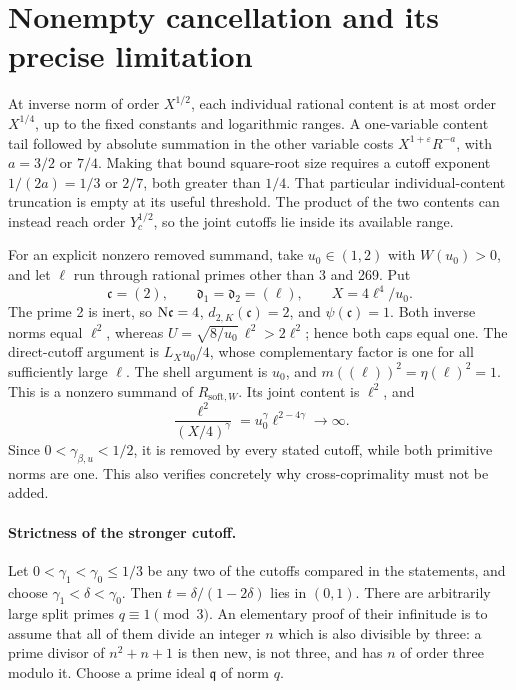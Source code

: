 \section{Nonempty cancellation and its precise limitation}
At inverse norm of order \(X^{1/2}\), each individual rational
content is at most order \(X^{1/4}\), up to the fixed constants
and logarithmic ranges.  A one-variable content tail followed
by absolute summation in the other variable costs
\(X^{1+\varepsilon}R^{-a}\), with \(a=3/2\) or \(7/4\).
Making that bound square-root size requires a cutoff exponent
\(1/(2a)=1/3\) or \(2/7\), both greater than \(1/4\).
That particular individual-content truncation is empty at its
useful threshold.  The product of the two contents can instead
reach order \(Y_c^{1/2}\), so the joint cutoffs lie inside
its available range.

For an explicit nonzero removed summand, take \(u_0\in(1,2)\)
with \(W(u_0)>0\), and let \(\ell\) run through rational primes
other than 3 and 269.  Put
\[
 \mathfrak c=(2),\qquad \mathfrak d_1=\mathfrak d_2=(\ell),
 \qquad X=4\ell^4/u_0.
\]
The prime 2 is inert, so \(\mathrm N\mathfrak c=4\),
\(d_{2,K}(\mathfrak c)=2\), and \(\psi(\mathfrak c)=1\).
Both inverse norms equal \(\ell^2\), whereas
\(U=\sqrt{8/u_0}\,\ell^2>2\ell^2\); hence both caps equal
one.  The direct-cutoff argument is \(L_Xu_0/4\), whose
complementary factor is one for all sufficiently large \(\ell\).
The shell argument is \(u_0\), and
\(m((\ell))^2=\eta(\ell)^2=1\).
This is a nonzero summand of \(R_{\mathrm{soft},W}\).
Its joint content is \(\ell^2\), and
\[
 \frac{\ell^2}{(X/4)^\gamma}
 =u_0^\gamma\ell^{2-4\gamma}\longrightarrow\infty.
\]
Since \(0<\gamma_{\beta,u}<1/2\), it is removed by every stated
cutoff, while both
primitive norms are one.  This also verifies concretely why
cross-coprimality must not be added.

\paragraph{Strictness of the stronger cutoff.}
Let \(0<\gamma_1<\gamma_0\le1/3\) be any two of the cutoffs
compared in the statements, and choose
\(\gamma_1<\delta<\gamma_0\). Then
\(t=\delta/(1-2\delta)\) lies in \((0,1)\).
There are arbitrarily large split primes \(q\equiv1\pmod3\).
An elementary proof of their infinitude is to assume that all of
them divide an integer \(n\) which is also divisible by three:
a prime divisor of \(n^2+n+1\) is then new, is not three, and
has \(n\) of order three modulo it.
Choose a prime ideal \(\mathfrak q\) of norm \(q\).

